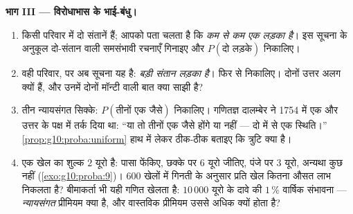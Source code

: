 \begin{problem}
\medskip
\noindent\textbf{भाग III --- विरोधाभास के भाई-बंधु।}
\begin{enumerate}[resume]
  \item किसी परिवार में दो संतानें हैं; आपको पता चलता है कि \emph{कम से कम
        एक लड़का है}। इस सूचना के अनुकूल दो-संतान वाली समसंभावी रचनाएँ
        गिनाइए और $P(\text{दो लड़के})$ निकालिए।
  \item वही परिवार, पर अब सूचना यह है: \emph{बड़ी संतान लड़का है}। फिर से
        निकालिए। दोनों उत्तर अलग क्यों हैं, और उनमें दोनों मॉन्टी वाली बात
        क्या साझी है?
  \item तीन न्यायसंगत सिक्के: $P(\text{तीनों एक जैसे})$ निकालिए। गणितज्ञ दालम्बेर ने 1754 में
        एक और उत्तर के पक्ष में तर्क दिया था: ``या तो तीनों एक जैसे होंगे
        या नहीं --- दो में से एक स्थिति।'' \cref{prop:g10:proba:uniform} हाथ में लेकर ठीक-ठीक बताइए
        कि त्रुटि क्या है।
  \item एक खेल का शुल्क $2$ यूरो है: पासा फेंकिए, छक्के पर $6$ यूरो
        जीतिए, पंजे पर $3$ यूरो, अन्यथा कुछ नहीं (\cref{exo:g10:proba:9})। $600$ खेलों
        में गिनती के अनुसार प्रति खेल कितना औसत लाभ निकलता है? बीमाकर्ता
        भी यही गणित खेलता है: $10\,000$ यूरो के दावे की $1\,\%$ वार्षिक संभावना
        --- \emph{न्यायसंगत} प्रीमियम क्या है, और वास्तविक प्रीमियम उससे
        अधिक क्यों होता है?
\end{enumerate}


\end{problem}
